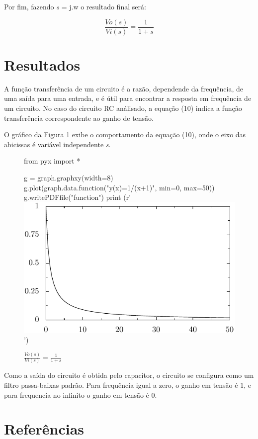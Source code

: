 \documentclass[12pt]{article}
\begin{document}
Por fim, fazendo \textit{s} = j.w o resultado final será:

\begin{equation}
\frac{Vo(s)}{Vi(s)}=\frac{1}{1+\textit{s}}
\end{equation}

\section{Resultados}
A função transferência de um circuito é a razão, dependende da frequência, de uma saída para uma entrada, e é útil para encontrar a resposta em frequência de um circuito. No caso do circuito RC análisado, a equação (10) indica a função transferência correspondente ao ganho de tensão.

O gráfico da Figura 1 exibe o comportamento da equação (10), onde o eixo das abicissas é variável independente  \textit{s}. 

\begin{figure}[h]
\centering
\begin{pycode}

from pyx import *

g = graph.graphxy(width=8)
g.plot(graph.data.function("y(x)=1/(x+1)", min=0, max=50))
g.writePDFfile("function")
print (r'\includegraphics{function}')
\end{pycode}
\caption{$\frac{Vo(s)}{Vi(s)}=$$\frac{1}{1+s}$}
\end{figure}

Como a saída do circuito é obtida pelo capacitor, o circuito se configura como um filtro passa-baixas padrão. Para frequência igual a zero, o ganho em tensão é 1, e para frequencia no infinito o ganho em tensão é 0.
 

\section{Referências}




\end{document}
